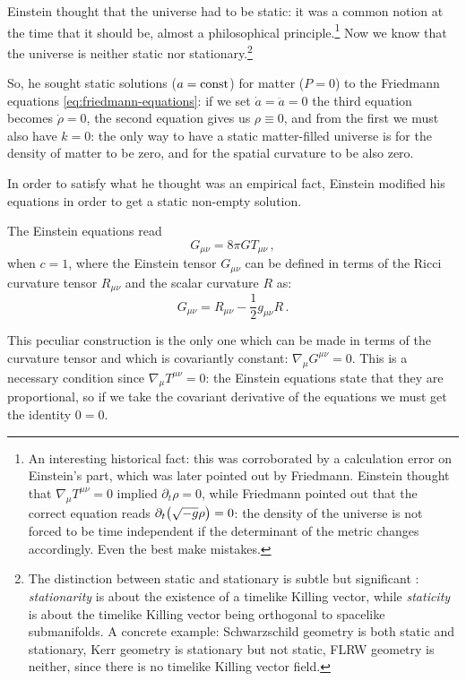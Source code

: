\documentclass[main.tex]{subfiles}
\begin{document}
Einstein thought that the universe had to be static: it was a common notion at the time that it should be, almost a philosophical principle.\footnote{An interesting historical fact: this was corroborated by a calculation error on Einstein's part, which was later pointed out by Friedmann. Einstein thought \cite{einsteinCommentFriedmannPaper1922} that \(\nabla_{\mu } T^{\mu \nu }= 0\) implied \(\partial_{t} \rho =0\), while Friedmann pointed out \cite{friedmannAlexanderFriedmann1922} that the correct equation reads \( \partial_{t} \qty(\sqrt{-g} \rho ) =0\): the density of the universe is not forced to be time independent if the determinant of the metric changes accordingly. Even the best make mistakes.}
Now we know that the universe is neither static nor stationary.\footnote{The distinction between static and stationary is subtle but significant \cite{ludvigsenGeneralRelativityGeometric1999}: \emph{stationarity} is about the existence of a timelike Killing vector, while \emph{staticity} is about the timelike Killing vector being orthogonal to spacelike submanifolds. 
A concrete example: Schwarzschild geometry is both static and stationary, Kerr geometry is stationary but not static, FLRW geometry is neither, since there is no timelike Killing vector field.}

So, he sought static solutions (\(a = \text{const}\)) for matter (\(P=0\)) to the Friedmann equations \eqref{eq:friedmann-equations}: if we set \(\dot{a} = \ddot{a} = 0\) 
the third equation becomes \(\dot{\rho}= 0\), the second equation gives us \(\rho \equiv 0\), and from the first we must also have \(k=0\): the only way to have a static matter-filled universe is for the density of matter to be zero, and for the spatial curvature to be also zero.

In order to satisfy what he thought was an empirical fact, Einstein modified his equations in order to get a static non-empty solution.

The Einstein equations read 
%
\begin{equation}
  G_{\mu \nu } = 8 \pi G T_{\mu \nu }
\,,
\end{equation}
%
when \(c=1\), where the Einstein tensor \(G_{\mu \nu }\) can be defined in terms of the Ricci curvature tensor \(R_{\mu \nu }\) and the scalar curvature \(R\) as:
%
\begin{equation}
  G_{ \mu \nu } = R_{\mu \nu } - \frac{1}{2} g_{\mu \nu }R
\,.
\end{equation}

This peculiar construction is the only one which can be made in terms of the curvature tensor and which is covariantly constant: \(\nabla_{\mu } G^{\mu \nu } = 0\). 
This is a necessary condition since \(\nabla_{\mu } T^{\mu \nu }=0\): the Einstein equations state that they are proportional, so if we take the covariant derivative of the equations we must get the identity \(0=0\).
\end{document}
